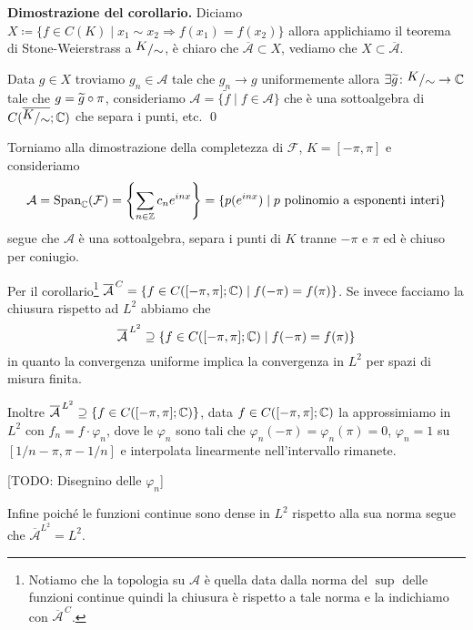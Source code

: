 \begin{enumerate}
\begin{minipage}{\textwidth - 2.5em}
		\textbf{Dimostrazione del corollario.}
		Diciamo $X \coloneqq \{ f \in C(K) \mid x_1 \sim x_2 \Rightarrow f(x_1) = f(x_2) \}$ allora applichiamo	il teorema di Stone-Weierstrass a $\sfrac{K}{\sim}$, è chiaro che $\overline{\mathcal A} \subset X$, vediamo che $X \subset \overline{\mathcal A}$. 

		Data $g \in X$ troviamo $g_n \in \mathcal A$ tale che $g_n \to g$ uniformemente allora $\exists \tilde g \colon \sfrac{K}{\sim} \to \C$ tale che $g = \widetilde g \circ \pi$, consideriamo $\mathcal A = \{ \tilde f \mid f \in \mathcal A \}$ che è una sottoalgebra di $C(\overline{\sfrac{K}{\sim}}; \C)$ che separa i punti, etc. 
		\qed
		\end{minipage}

		Torniamo alla dimostrazione della completezza di $\mathcal F$, $K = [-\pi, \pi]$ e consideriamo
		$$
		\mathcal A = \operatorname{Span}_\mathbb C(\mathcal F) = \left\{ \sum_{n \in \mathbb Z} c_n e^{inx} \right\} = \{ p(e^{inx}) \mid p \text{ polinomio a esponenti interi} \}
		$$
		segue che $\mathcal A$ è una sottoalgebra, separa i punti di $K$ tranne $-\pi$ e $\pi$ ed è chiuso per coniugio.

		Per il corollario\footnote{Notiamo che la topologia su $\mathcal A$ è quella data dalla norma del $\sup$ delle funzioni continue quindi la chiusura è rispetto a tale norma e la indichiamo con $\overline{\mathcal A}^{\,C}$.} $\overline{\mathcal A}^{\,C} = \{ f \in C([-\pi, \pi]; \mathbb C) \mid f(-\pi) = f(\pi) \}$. Se invece facciamo la chiusura rispetto ad $L^2$ abbiamo che 
		$$
		\overline{\mathcal A}^{\,L^2} \supseteq \{ f \in C([-\pi, \pi]; \mathbb C) \mid f(-\pi) = f(\pi) \}
		$$
		in quanto la convergenza uniforme implica la convergenza in $L^2$ per spazi di misura finita.

		Inoltre $\overline{\mathcal A}^{\,L^2} \supseteq \{ f \in C([-\pi, \pi]; \mathbb C) \}$, data $f \in C([-\pi, \pi]; \mathbb C)$ la approssimiamo in $L^2$ con $f_n = f \cdot \varphi_n$, dove le $\varphi_n$ sono tali che $\varphi_n(-\pi) = \varphi_n(\pi) = 0$, $\varphi_n = 1$ su $[1/n - \pi, \pi - 1/n]$ e interpolata linearmente nell'intervallo rimanete.

		[TODO: Disegnino delle $\varphi_n$]

		Infine poiché le funzioni continue sono dense in $L^2$ rispetto alla sua norma segue che $\overline{\mathcal A}^{L^2} = L^2$.

\end{enumerate}

